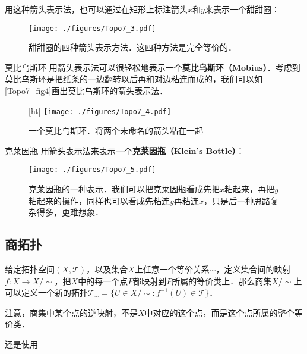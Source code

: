 用这种箭头表示法，也可以通过在矩形上标注箭头$x$和$y$来表示一个甜甜圈：

\begin{figure}[ht]
\centering
\texttt{[image: ./figures/Topo7\_3.pdf]}
\caption{甜甜圈的四种箭头表示方法．这四种方法是完全等价的．} \label{Topo7_fig3}
\end{figure}

\begin{example}{莫比乌斯环}
用箭头表示法可以很轻松地表示一个\textbf{莫比乌斯环（Mobius）}．考虑到莫比乌斯环是把纸条的一边翻转以后再和对边粘连而成的，我们可以如\autoref{Topo7_fig4}画出莫比乌斯环的箭头表示法．

\begin{figure}\label{Topo7_fig6}[ht]
\centering
\texttt{[image: ./figures/Topo7\_4.pdf]}
\caption{一个莫比乌斯环．将两个未命名的箭头粘在一起} \label{Topo7_fig4}
\end{figure}

\end{example}



\begin{example}{克莱因瓶}
用箭头表示法来表示一个\textbf{克莱因瓶（Klein's Bottle）}：
\begin{figure}[ht]
\centering
\texttt{[image: ./figures/Topo7\_5.pdf]}
\caption{克莱因瓶的一种表示．我们可以把克莱因瓶看成先把$x$粘起来，再把$y$粘起来的操作，同样也可以看成先粘连$y$再粘连$x$，只是后一种思路复杂得多，更难想象．} \label{Topo7_fig5}
\end{figure}

\end{example}



\subsection{商拓扑}

给定拓扑空间$(X, \mathcal{T})$，以及集合$X$上任意一个等价关系$\sim$，定义集合间的映射$f:X\rightarrow X/\sim$，把$X$中的每一个点$P$都映射到$P$所属的等价类上．那么商集$X/\sim$上可以定义一个新的拓扑$\mathcal{T}_\sim=\{U\in X/\sim: f^{-1}(U)\in\mathcal{T}\}$．

注意，商集中某个点的逆映射，不是$X$中对应的这个点，而是这个点所属的整个等价类．

\begin{example}{}

还是使用

\end{example}



